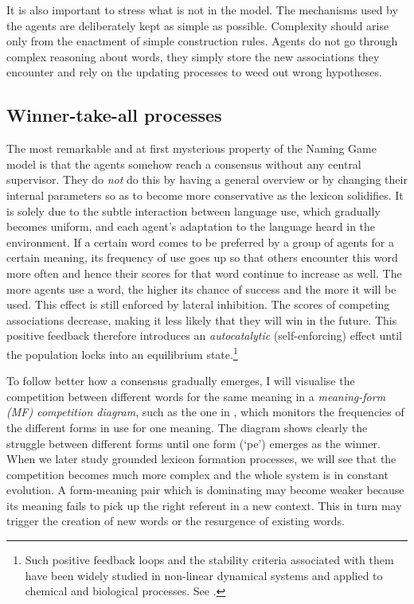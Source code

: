It is also important to stress what is not in the model. 
The mechanisms used by the agents are deliberately kept as 
simple as possible. Complexity should arise only from the 
enactment of simple construction rules. Agents do not 
go through complex reasoning about words, they simply 
store the new associations they encounter and rely on 
the updating processes to weed out wrong hypotheses. 

\subsection{Winner-take-all processes}

The most remarkable and at first mysterious property of the 
Naming Game model is that the agents somehow reach a consensus
without any central supervisor. They do {\itshape not} do this by 
having a general overview or by changing their internal 
parameters so as to become more conservative as the lexicon
solidifies. It is solely due to the subtle interaction between
language use, which gradually becomes uniform, and each agent's
adaptation to the language heard in the environment. 
If a certain word comes to be preferred by a group of agents
for a certain meaning, its frequency of use goes up so that
others encounter this 
word more often and hence their scores for that word
continue to increase as well.
The more agents use a word, the higher its chance of success
and the more it will be used. This effect is still enforced 
by lateral inhibition. The scores of competing associations 
decrease, making it less likely that they will win in the future. 
This positive feedback therefore introduces an 
{\itshape autocatalytic} (self-enforcing) effect until the population
locks into an equilibrium state.\footnote{
Such positive feedback loops and the stability criteria
associated with them have been widely studied in non-linear
dynamical systems and applied to chemical and biological 
processes. See \cite{Babloyantz:1986}.}

To follow better how a consensus gradually emerges, I will visualise
the competition between different words for the same meaning
in a {\itshape meaning-form (MF) competition diagram}, 
such as the one in , which monitors 
the frequencies of the different forms in use for one meaning.
The diagram shows clearly the struggle between different forms until
one form (`pe') emerges as the winner. When we later study 
grounded lexicon formation processes, we will see that the 
competition becomes much more complex and the whole system 
is in constant evolution. A form-meaning pair which is 
dominating may become weaker because its meaning
fails to pick up the right
referent in a new context. 
This in turn may trigger the creation of new words or the 
resurgence of existing words. 


